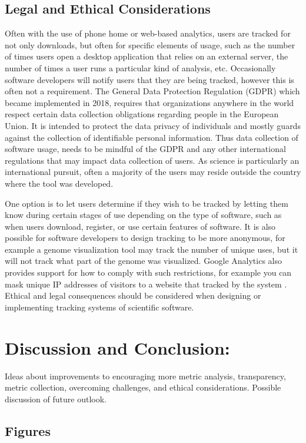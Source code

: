 \documentclass{article}
\begin{document}
\subsection{Legal and Ethical Considerations}
Often with the use of phone home or web-based analytics, users are tracked for not only downloads, but often for specific elements of usage, such as the number of times users open a desktop application that relies on an external server, the number of times a user runs a particular kind of analysis, etc. Occasionally software developers will notify users that they are being tracked, however this is often not a requirement. The General Data Protection Regulation (GDPR) which became implemented in 2018, requires that organizations anywhere in the world respect certain data collection obligations regarding people in the European Union. It is intended to protect the data privacy of individuals and mostly guards against the collection of identifiable personal information. Thus data collection of software usage, needs to be mindful of the GDPR and any other international regulations that may impact data collection of users.  As science is particularly an international pursuit, often a majority of the users may reside outside the country where the tool was developed.

One option is to let users determine if they wish to be tracked by letting them know during certain stages of use depending on the type of software, such as when users download, register, or use certain features 
 of software. It is also possible for software developers to design tracking to be more anonymous, for example a genome visualization tool may track the number of unique uses, but it will not track what part of the genome was visualized. Google Analytics also provides support for how to comply with such restrictions, for example you can  mask unique IP addresses of visitors to a website that tracked by the system \cite{google_analytics_privacy}.  Ethical and legal consequences should be considered when designing or implementing tracking systems of scientific software. 



\section{Discussion and Conclusion:}
 Ideas about improvements to encouraging more metric analysis, transparency, metric collection, overcoming challenges, and ethical considerations. Possible discussion of future outlook.
\subsection{Figures}
\end{document}
